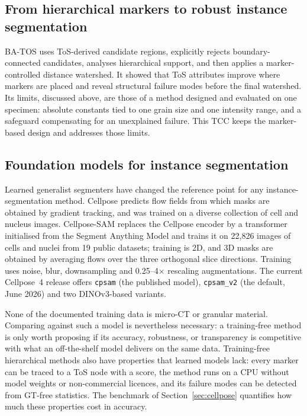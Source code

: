 \documentclass[12pt]{article}
\begin{document}
\subsection{From hierarchical markers to robust instance segmentation}

BA-TOS \citep{dias2026} uses ToS-derived candidate regions, explicitly rejects boundary-connected candidates,
analyses hierarchical support, and then applies a marker-controlled distance watershed. It showed that ToS
attributes improve where markers are placed and reveal structural failure modes before the final watershed. Its
limits, discussed above, are those of a method designed and evaluated on one specimen: absolute constants tied to
one grain size and one intensity range, and a safeguard compensating for an unexplained failure. This TCC keeps the
marker-based design and addresses those limits.

\subsection{Foundation models for instance segmentation}

Learned generalist segmenters have changed the reference point for any instance-segmentation method. Cellpose
\citep{stringer2021} predicts flow fields from which masks are obtained by gradient tracking, and was trained on a
diverse collection of cell and nucleus images. Cellpose-SAM \citep{pachitariu2025} replaces the Cellpose encoder
by a transformer initialised from the Segment Anything Model \citep{kirillov2023} and trains it on 22,826 images
of cells and nuclei from 19 public datasets; training is 2D, and 3D masks are obtained by averaging flows over the
three orthogonal slice directions. Training uses noise, blur, downsampling and 0.25--4$\times$ rescaling
augmentations. The current Cellpose~4 release offers \texttt{cpsam} (the published model), \texttt{cpsam\_v2}
(the default, June 2026) and two DINOv3-based variants.

None of the documented training data is micro-CT or granular material. Comparing against such a model is
nevertheless necessary: a training-free method is only worth proposing if its accuracy, robustness, or
transparency is competitive with what an off-the-shelf model delivers on the same data. Training-free hierarchical
methods also have properties that learned models lack: every marker can be traced to a ToS node with a score, the
method runs on a CPU without model weights or non-commercial licences, and its failure modes can be detected from
GT-free statistics. The benchmark of Section~\ref{sec:cellpose} quantifies how much these properties cost in
accuracy.
\end{document}
